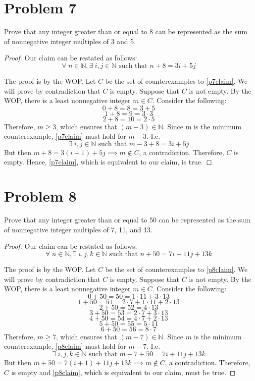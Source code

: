 \documentclass{article}
\begin{document}
\pagebreak

\section{Problem 7}
Prove that any integer greater than or equal to 8 can be represented as the sum of nonnegative integer multiples of 3 and 5.
\begin{proof}
	Our claim can be restated as follows:
	\begin{equation}\label{p7claim}
		\forall \; n \in \mathbb{N}, \exists \; i, j \in \mathbb{N} \text{ such that } n + 8 = 3i + 5j
	\end{equation}

	The proof is by the WOP. Let $C$ be the set of counterexamples to \eqref{p7claim}. We will prove by contradiction that $C$ is empty. Suppose that $C$ is not empty. By the WOP, there is a least nonnegative integer $m \in C$. Consider the following:
	\[
		0 + 8 = 8 = 3 + 5
	\]
	\[
		1 + 8 = 9 = 3 \cdot 3
	\]
	\[
		2 + 8 = 10 = 2 \cdot 5
	\]
	Therefore, $m \geq 3$, which ensures that $(m - 3) \in \mathbb{N}$. Since m is the minimum counterexample, \eqref{p7claim} must hold for $m - 3$. I.e.
	\[
		\exists \; i, j \in \mathbb{N} \text{ such that } m - 3 + 8 = 3i + 5j
	\]
	But then $m + 8 = 3(i+1) + 5j \implies m \notin C$, a contradiction. Therefore, $C$ is empty. Hence, \eqref{p7claim}, which is equivalent to our claim, is true.
\end{proof}

\pagebreak

\section{Problem 8}
Prove that any integer greater than or equal to
50 can be represented as the sum of nonnegative integer multiples of 7, 11, and 13.

\begin{proof}
	Our claim can be restated as follows:
	\begin{equation}\label{p8claim}
		\forall \; n \in \mathbb{N}, \exists \; i, j, k \in \mathbb{N} \text{ such that } n + 50 = 7i + 11j + 13k
	\end{equation}

	The proof is by the WOP. Let $C$ be the set of counterexamples to \eqref{p8claim}. We will prove by contradiction that $C$ is empty. Suppose that $C$ is not empty. By the WOP, there is a least nonnegative integer $m \in C$. Consider the following:
	\[
		0 + 50 = 50 = 1 \cdot 11 + 3 \cdot 13
	\]
	\[
		1 + 50 = 51 = 2 \cdot 7 + 1 \cdot 11 + 2 \cdot 13
	\]
	\[
		2 + 50 = 52 = 4 \cdot 13
	\]
	\[
		3 + 50 = 53 = 2 \cdot 7 + 3 \cdot 13
	\]
	\[
		4 + 50 = 54 = 4 \cdot 7 + 2 \cdot 13
	\]
	\[
		5 + 50 = 55 = 5 \cdot 11
	\]
	\[
		6 + 50 = 56 = 8 \cdot 7
	\]
	Therefore, $m \ge 7$, which ensures that $(m - 7) \in \mathbb{N}$. Since $m$ is the minimum counterexample, \eqref{p8claim} must hold for $m - 7$. I.e.
	\[
		\exists \; i, j, k \in \mathbb{N} \text{ such that } m - 7 + 50 = 7i + 11j + 13k
	\]
	But then $m + 50 = 7(i+1) + 11j + 13k \implies m \notin C$, a contradiction. Therefore, $C$ is empty and \eqref{p8claim}, which is equivalent to our claim, must be true.
\end{proof}
\end{document}
